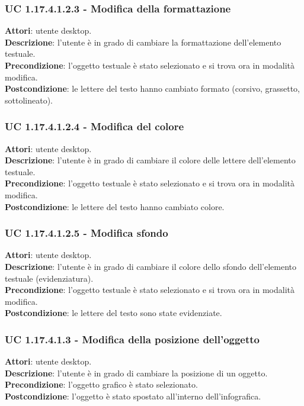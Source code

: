 \subsubsection{UC 1.17.4.1.2.3 - Modifica della formattazione}{
	\label{uc1.17.4.1.2.3}
	\textbf{Attori}: utente desktop. \\
	\textbf{Descrizione}: l'utente è in grado di cambiare la formattazione dell’elemento testuale. \\
	\textbf{Precondizione}: l'oggetto testuale è stato selezionato e si trova ora in modalità modifica.\\
	\textbf{Postcondizione}: le lettere del testo hanno cambiato formato (corsivo, grassetto, sottolineato).
	}
\subsubsection{UC 1.17.4.1.2.4 - Modifica del colore}{
	\label{uc1.17.4.1.2.4}
	\textbf{Attori}: utente desktop. \\
	\textbf{Descrizione}: l'utente è in grado di cambiare il colore delle lettere dell’elemento testuale. \\
	\textbf{Precondizione}: l'oggetto testuale è stato selezionato e si trova ora in modalità modifica.\\
	\textbf{Postcondizione}: le lettere del testo hanno cambiato colore.
	}
\subsubsection{UC 1.17.4.1.2.5 - Modifica sfondo}{
	\label{uc1.17.4.1.2.5}
	\textbf{Attori}: utente desktop. \\
	\textbf{Descrizione}: l'utente è in grado di cambiare il colore dello sfondo dell’elemento testuale (evidenziatura). \\
	\textbf{Precondizione}: l'oggetto testuale è stato selezionato e si trova ora in modalità modifica.\\
	\textbf{Postcondizione}: le lettere del testo sono state evidenziate.
	}
\subsubsection{UC 1.17.4.1.3 - Modifica della posizione dell'oggetto}{
	\label{uc1.17.4.1.3}
	\textbf{Attori}: utente desktop. \\
	\textbf{Descrizione}: l'utente è in grado di cambiare la posizione di un oggetto. \\
	\textbf{Precondizione}: l'oggetto grafico è stato selezionato.\\
	\textbf{Postcondizione}: l'oggetto è stato spostato all’interno dell’infografica.
	}
